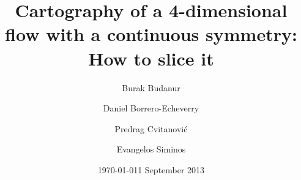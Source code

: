 \documentclass[aip,cha,
reprint,
secnumarabic,
nofootinbib, tightenlines,
nobibnotes, showkeys, showpacs,
groupedaddress,
]{revtex4-1}
\begin{document}
\title[Low-dimensional cartography]
{Cartography of a 4-dimensional flow with a continuous symmetry:
How to slice it}

\author{Burak Budanur}
\author{Daniel Borrero-Echeverry}
\author{Predrag Cvitanovi\'{c}}
\author{Evangelos Siminos}
    \ifdraft
\date{\today}
    \else
\date{1 September 2013}
   \fi
\end{document}

